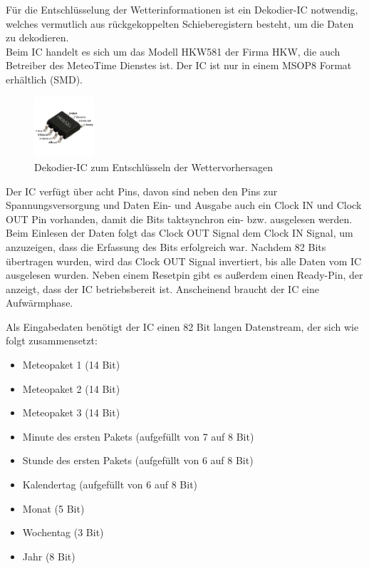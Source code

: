 \documentclass[a4paper,11pt]{article}
\begin{document}
\vspace{0.3cm}
\noindent
Für die Entschlüsselung der Wetterinformationen ist ein Dekodier-IC notwendig, welches vermutlich aus rückgekoppelten Schieberegistern besteht, um die Daten zu dekodieren. \\
Beim IC handelt es sich um das Modell HKW581 der Firma HKW, die auch Betreiber des MeteoTime Dienstes ist. Der IC ist nur in einem MSOP8 Format erhältlich (SMD).

\begin{figure}[H]
  \centering
  \includegraphics[width = 0.2\textwidth]{HKW5811}
  \caption{Dekodier-IC zum Entschlüsseln der Wettervorhersagen}
  \label{fig:hkw581}
\end{figure}

\noindent
Der IC verfügt über acht Pins, davon sind neben den Pins zur Spannungsversorgung und Daten Ein- und Ausgabe auch ein Clock IN und Clock OUT Pin vorhanden, damit die Bits
taktsynchron ein- bzw. ausgelesen werden. Beim Einlesen der Daten folgt das Clock OUT Signal dem Clock IN Signal, um anzuzeigen, dass die Erfassung des Bits erfolgreich war. 
Nachdem 82 Bits übertragen wurden, wird das Clock OUT Signal invertiert, bis alle Daten vom IC ausgelesen wurden. 
Neben einem Resetpin gibt es außerdem einen Ready-Pin, der anzeigt, dass der IC betriebsbereit ist. Anscheinend braucht der IC eine Aufwärmphase. 

\vspace{0.2cm}
\noindent
Als Eingabedaten benötigt der IC einen 82 Bit langen Datenstream, der sich wie folgt zusammensetzt:
\begin{itemize}
  \item Meteopaket 1 (14 Bit)
  \item Meteopaket 2 (14 Bit)
  \item Meteopaket 3 (14 Bit)
  \item Minute des ersten Pakets (aufgefüllt von 7 auf 8 Bit)
  \item Stunde des ersten Pakets (aufgefüllt von 6 auf 8 Bit)
  \item Kalendertag (aufgefüllt von 6 auf 8 Bit)
  \item Monat (5 Bit)
  \item Wochentag (3 Bit)
  \item Jahr (8 Bit)
\end{itemize}
\end{document}
